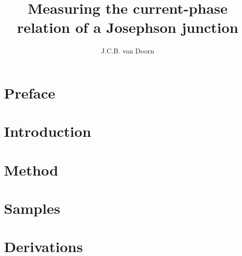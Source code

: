 \documentclass[draft,twoside,single]{lion-msc}
\title{Measuring the current-phase relation of a Josephson junction}
\author{J.C.B. van Doorn}
\begin{document}
	\maketitle

	\tableofcontents

	\chapter*{Preface}
	

	\chapter{Introduction}
	

	\chapter{Method}
	

	\chapter{Samples}
	

	\appendix
	\chapter{Derivations}
	

	\printbibliography
\end{document}
